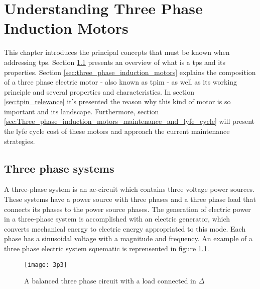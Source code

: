 \chapter{Understanding Three Phase Induction Motors}
\label{cha:users_manual}



This chapter introduces the principal concepts that must be known when addressing \acrfull{tps}. Section \ref{sec:three_phase_systems} presents an overview of what is a \acrshort{tps} and its properties. Section \ref{sec:three_phase_induction_motors} explains the composition of a three phase electric motor - also known as \acrfull{tpim} - as well as its working principle and several properties and characteristics. In section \ref{sec:tpin_relevance} it's presented the reason why this kind of motor is so important and its landscape. Furthermore, section \ref{sec:Three_phase_induction_motors_maintenance_and_lyfe_cycle} will present the lyfe cycle cost of these motors and approach the current maintenance strategies.

\section{Three phase systems} %
\label{sec:three_phase_systems}

A three-phase system is an \acrshort{ac}-circuit which contains three voltage power sources. These systems have a power source with three phases and a three phase load that connects its phases to the power source phases. The generation of electric power in a three-phase system is accomplished with an electric generator, which converts mechanical energy to electric energy appropriated to this mode. Each phase has a sinusoidal voltage with a magnitude and frequency. An example of a three phase electric system squematic is reprensented in figure \ref{fig:balanced_tp_circuit}.

\begin{figure}[htbp]
	\centering
	\texttt{[image: 3p3]}
	\caption{A balanced three phase circuit with a load connected in $\Delta$}
	\label{fig:balanced_tp_circuit}
\end{figure}

